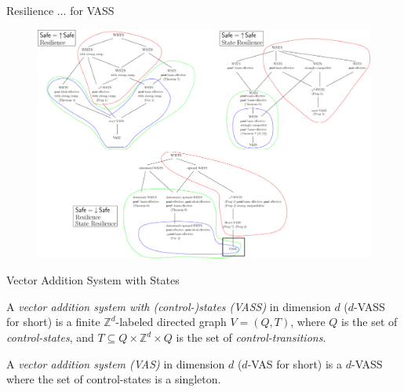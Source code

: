 \documentclass{beamer}
\begin{document}
  \begin{frame}{Resilience $\ldots$ for VASS}
 
   \begin{center}
 	\begin{figure}
 	\vspace{-0.25cm}
\includegraphics[width=1.00\textwidth]{resultC}
	\end{figure}
\end{center}  


  \end{frame}
  \begin{frame}{Vector Addition System with States}
 
 
 \begin{definition} 
A {\em vector addition system with (control-)states (VASS)} in dimension $d$ ($d$-VASS for short) is a finite $\mathds{Z}^d$-labeled directed graph $V = (Q,T)$, where $Q$ is the set of {\em control-states}, and $T \subseteq Q \times \mathds{Z}^d \times Q$ is the set of {\em control-transitions}. 
 \end{definition} 

 \begin{definition} 
A {\em vector addition system (VAS)} in dimension $d$ ($d$-VAS for short) is a $d$-VASS where the set of control-states is a singleton.
 \end{definition} 

  \end{frame}
\end{document}
